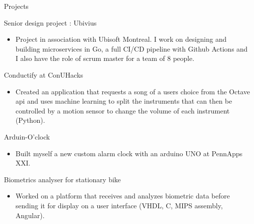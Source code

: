 \documentclass{article}
\newlength{\tabin}
\newlength{\secsep}
\newcommand{\lineunder}{\vspace*{-8pt} \\ \hspace*{-6pt} \hrulefill \\ \vspace*{-15pt}}
\newenvironment{tabbedsection}[1]{
  \begin{list}{}{
      \setlength{\itemsep}{0pt}
      \setlength{\labelsep}{0pt}
      \setlength{\labelwidth}{0pt}
      \setlength{\leftmargin}{\tabin}
      \setlength{\rightmargin}{\tabin}
      \setlength{\listparindent}{0pt}
      \setlength{\parsep}{0pt}
      \setlength{\parskip}{0pt}
      \setlength{\partopsep}{0pt}
      \setlength{\topsep}{#1}
    }
  \item[]
}{\end{list}}
\newenvironment{resume_section}[1]{
  \filbreak
  \vspace{2\secsep}
  \textsc{\large#1}
  \lineunder
  \begin{tabbedsection}{\secsep}
}{\end{tabbedsection}}
\newenvironment{resume_subsection}[2][]{
  \textbf{#2} \hfill {\footnotesize #1} \hspace{2em}
  \begin{tabbedsection}{0.5\secsep}
}{\end{tabbedsection}}
\newenvironment{subitems}{
  \renewcommand{\labelitemi}{-}
  \begin{itemize}
      \setlength{\labelsep}{1em}
}{\end{itemize}}
\begin{document}
\begin{resume_section}{Projects}
  \begin{resume_subsection}{Senior design project : Ubivius}
  \begin{subitems}
    \item Project in association with Ubisoft Montreal. I work on designing and building microservices in Go, a full CI/CD pipeline with Github Actions and I also have the role of scrum master for a team of 8 people.
    \end{subitems}
  \end{resume_subsection}
  \begin{resume_subsection}[January 2020]{Conductify at ConUHacks}
  \begin{subitems}
    \item Created an application that requests a song of a users choice from the Octave api and uses machine learning to split the instruments that can then be controlled by a motion sensor to change the volume of each instrument (Python).
    \end{subitems}
  \end{resume_subsection}
  
  \begin{resume_subsection}[September 2020]{Arduin-O'clock}
  \begin{subitems}
    \item Built myself a new custom alarm clock with an arduino UNO at PennApps XXI.
    \end{subitems}
  \end{resume_subsection}
  
  \begin{resume_subsection}[Winter 2019]{Biometrics analyser for stationary bike}
  \begin{subitems}
    \item Worked on a platform that receives and analyzes biometric data before sending it for display on a user interface (VHDL, C, MIPS assembly, Angular).
    \end{subitems}
  \end{resume_subsection}
\end{resume_section}
\end{document}
